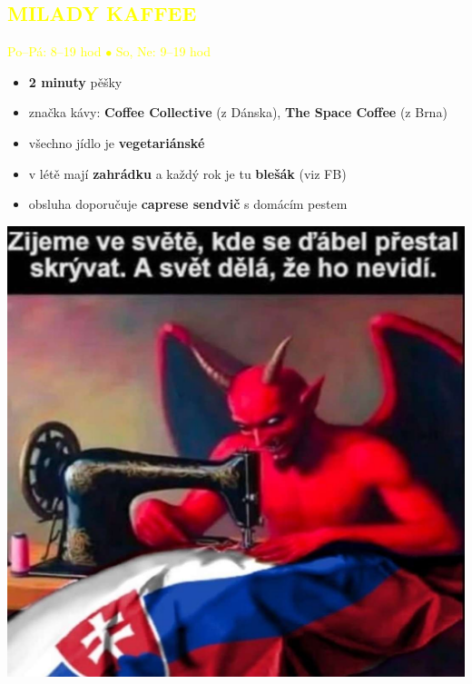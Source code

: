 \documentclass{article}
\newcommand{\podnadpisy}[1]{
  \subsection*{\textcolor{yellow}{#1}}
}
\begin{document}
\noindent
\begin{minipage}{0.7\textwidth}
  \podnadpisy{MILADY KAFFEE}
  \textcolor{yellow}{Po--Pá: 8--19 hod $\bullet$ So, Ne: 9--19 hod}
  \vspace{5pt}
  \small
  \begin{itemize}[leftmargin=10pt]
    \item \textbf{2 minuty} pěšky
    \item značka kávy: \textbf{Coffee Collective} (z Dánska), \textbf{The Space Coffee} (z Brna)
    \item všechno jídlo je \textbf{vegetariánské}
    \item v létě mají \textbf{zahrádku} a každý rok je tu \textbf{blešák} (viz FB)
    \item obsluha doporučuje \textbf{caprese sendvič} s domácím pestem
  \end{itemize}
\end{minipage}
\hfill
\begin{minipage}{0.27\textwidth}
  \includegraphics[width=\linewidth]{dulezite.jpg}
\end{minipage}
\\
\end{document}
